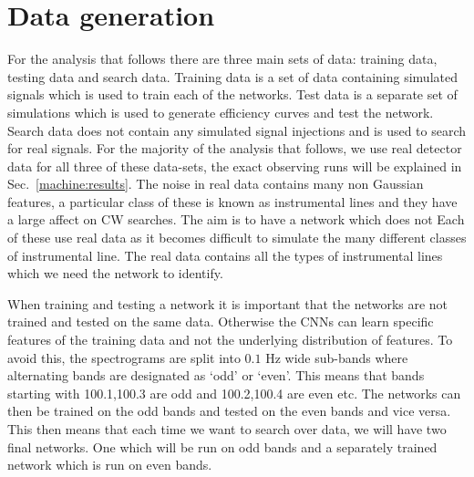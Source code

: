 \section{\label{machine:data} Data generation}

%

For the analysis that follows there are three main sets of data: training data,
testing data and search data. 
Training data is a set of data containing simulated signals which is used to train each of
the networks.
Test data is a separate set of simulations which is used to generate
efficiency curves and test the network.
Search data does not contain any simulated signal injections and is used to search for real signals.
For the majority of the analysis that follows, we use real detector data for all three of these data-sets, the exact observing runs will be explained in Sec.~\ref{machine:results}. 
The noise in real data contains many non Gaussian features, a particular class of these is known as instrumental lines and they have a large affect on \ac{CW} searches. 
The aim is to have a network which does not 
Each of these use
real data as it becomes difficult to simulate the many different classes of
instrumental line. The real data contains all the types of instrumental lines
which we need the network to identify.~ 

%
When training and testing a network it is important that the networks are not
trained and tested on the same data. Otherwise the \acp{CNN} can learn specific
features of the training data and not the underlying
distribution of features. To avoid this, the spectrograms are split into $0.1$
Hz wide sub-bands where alternating bands are designated as `odd' or `even'.
This means that bands starting with 100.1,100.3 are odd and 100.2,100.4 are
even etc. The networks can then be trained on the odd bands and tested on the
even bands and vice versa.
This then means that each time we want to search over data, we will have two final networks. One which will be run on odd bands and a separately trained network which is run on even bands. 

